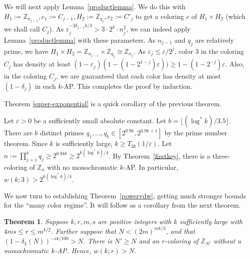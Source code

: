 \documentclass[11pt]{article}
\makeatletter
\numberwithin{equation}{section}
\renewenvironment{proof}[1][\proofname]{\par
  \vspace{-\topsep}%
  \pushQED{\qed}%
  \normalfont
  \topsep0pt \partopsep0pt %
  \trivlist
  \item[\hskip\labelsep
        \itshape
    #1\@addpunct{.}]\ignorespaces
}{%
  \popQED\endtrivlist\@endpefalse
  \addvspace{6pt plus 6pt} %
}
\newtheorem{thm}{Theorem}
\theoremstyle{definition}
\theoremstyle{remark}
\makeatother
\begin{document}
\begin{proof}
We will next apply Lemma~\ref{productlemma}. We do this with $H_1:=\mathbb{Z}_{n_{j-1}}, c_1:= C_{j-1},H_2:=\mathbb{Z}_{q_j},c_2:= C'_j$ to get a coloring $c$ of $H_1\times H_2$ (which we shall call $C_j$). As $\varepsilon_j^{-2\delta_{j-1} k/3}>3 \cdot 2^k \cdot n_j^{2}$, we can indeed apply Lemma~\ref{productlemma} with these parameters.  As $n_{j-1}$ and $q_j$ are relatively prime, we have $H_1 \times H_2 = \mathbb{Z}_{n_{j-1}} \times \mathbb{Z}_{q_j} \cong \mathbb{Z}_{n_j}$. As $\varepsilon_j \leq \varepsilon/2^j$, color $3$ in the coloring $C_j$ has density at least $(1-\varepsilon_j)(1-(1-2^{1-j})\varepsilon)) \geq 1-(1-2^{-j})\varepsilon$. Also, in the coloring $C_j$, we are guaranteed that each color has density at most $(1-\delta_j)$ in each $k$-AP. This completes the proof by induction. 
\end{proof}

Theorem \ref{super-exponential} is a quick corollary of the previous theorem. 

\begin{proof}[Proof of Theorem \ref{super-exponential}]

Let $\varepsilon>0$ be a sufficiently small absolute constant. Let $b=\lfloor (\log^* k)/3.5\rfloor$. There are $b$ distinct primes $q_1,\ldots,q_b \in [2^{0.9k},2^{0.9k+1}]$ by the prime number theorem. Since $k$ is sufficiently large, $k \geq T_{3b}(1/\varepsilon)$. Let $n:=\prod_{j=1}^b q_j \geq 2^{0.9kb} \geq 2^{k(\log^* k)/4}$. 
By Theorem~\ref{firstkey}, there is a three-coloring of $\mathbb{Z}_n$ with no monochromatic $k$-AP. In particular, $w(k;3) > 2^{k(\log^* k)/4}$. 
\end{proof}

We now turn to establishing Theorem~\ref{powervdw}, getting much stronger bounds for the ``many color regime''. It will follow as a corollary from the next theorem.

\begin{thm}\label{masterpower}
    Suppose $k,r,m,s$ are positive integers with $k$ sufficiently large with $4ms \le r\le m^{k/2}$. Further suppose that $N<(2m)^{mk/3}$, and that $(1-\delta_k(N))^{-sk/100}>N$. There is $N' \geq N$ and an $r$-coloring of $\mathbb{Z}_{N'}$ without a monochromatic $k$-AP. Hence, $w(k;r)> N$.
\end{thm}
\end{document}
